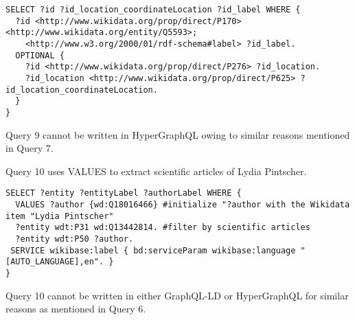 \begin{minipage}{\linewidth}
\begin{lstlisting}[label=listing:listing52, caption={Query 9 - GraphQL-LD}]
SELECT ?id ?id_location_coordinateLocation ?id_label WHERE {
  ?id <http://www.wikidata.org/prop/direct/P170> <http://www.wikidata.org/entity/Q5593>;
    <http://www.w3.org/2000/01/rdf-schema#label> ?id_label.
  OPTIONAL {
    ?id <http://www.wikidata.org/prop/direct/P276> ?id_location.
    ?id_location <http://www.wikidata.org/prop/direct/P625> ?id_location_coordinateLocation.
  }
}
\end{lstlisting}
\end{minipage}

Query 9 cannot be written in HyperGraphQL owing to similar reasons mentioned in Query 7.

Query 10 uses VALUES to extract scientific articles of Lydia Pintscher.

\begin{minipage}{\linewidth}
\begin{lstlisting}[label=listing:listing53, caption={Query 10}]
SELECT ?entity ?entityLabel ?authorLabel WHERE {
  VALUES ?author {wd:Q18016466} #initialize "?author with the Wikidata item "Lydia Pintscher"
  ?entity wdt:P31 wd:Q13442814. #filter by scientific articles
  ?entity wdt:P50 ?author.
 SERVICE wikibase:label { bd:serviceParam wikibase:language "[AUTO_LANGUAGE],en". }
}
\end{lstlisting}
\end{minipage}

Query 10 cannot be written in either GraphQL-LD or HyperGraphQL for similar reasons as mentioned in Query 6.

